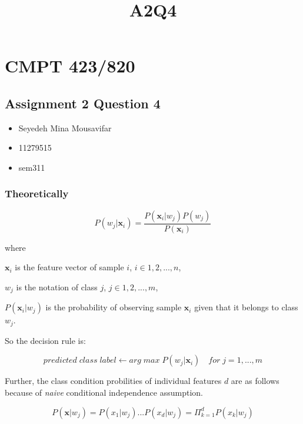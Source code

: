 \documentclass[11pt]{article}
\title{A2Q4}
\providecommand{\tightlist}{%
      \setlength{\itemsep}{0pt}\setlength{\parskip}{0pt}}
\begin{document}
    
    
    \maketitle
    
    

    
    \hypertarget{cmpt-423820}{%
\section{CMPT 423/820}\label{cmpt-423820}}

\hypertarget{assignment-2-question-4}{%
\subsection{Assignment 2 Question 4}\label{assignment-2-question-4}}

\begin{itemize}
\tightlist
\item
  Seyedeh Mina Mousavifar
\item
  11279515
\item
  sem311
\end{itemize}

    \hypertarget{theoretically}{%
\subsubsection{Theoretically}\label{theoretically}}

    \[
P(w_j|\mathbf{x}_i) = \frac{P(\mathbf{x}_i|w_j)P(w_j)}{P(\mathbf{x}_i)}
\]

where

\(\mathbf{x}_i\) is the feature vector of sample \(i\),
\(i \in {1,2,...,n}\),

\(w_j\) is the notation of class \(j\), \(j \in {1,2,...,m}\),

\(P(\mathbf{x}_i|w_j)\) is the probability of observing sample
\(\mathbf{x}_i\) given that it belongs to class \(w_j\).

So the decision rule is:

\[
predicted \; class \; label \leftarrow arg \; max \; P(w_j|\mathbf{x}_i) \quad for \; j=1,...,m
\]

Further, the class condition probilities of individual features \(d\)
are as follows because of \emph{naive} conditional independence
assumption.

\[
P(\mathbf{x}|w_j) = P(x_1|w_j)...P(x_d|w_j) = \Pi_{k=1}^{d}P(x_k|w_j)
\]
\end{document}
